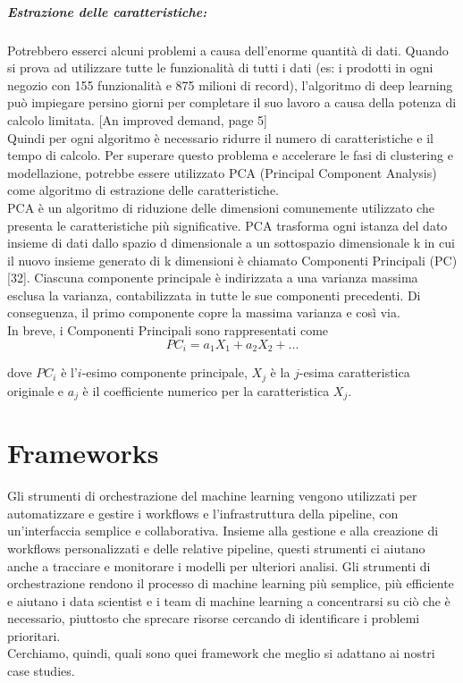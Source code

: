 \documentclass[12pt,a4paper]{report}
\begin{document}
\paragraph*{Estrazione delle caratteristiche:}
Potrebbero esserci alcuni problemi a causa dell'enorme quantità di dati. Quando si prova ad utilizzare tutte le funzionalità di tutti i dati (es: i prodotti in ogni negozio con 155 funzionalità e 875 milioni di record), l'algoritmo di deep learning può impiegare persino giorni per completare il suo lavoro a causa della potenza di calcolo limitata. [An improved demand, page 5]\\
Quindi per ogni algoritmo è necessario ridurre il numero di caratteristiche e il tempo di calcolo. Per superare questo problema e accelerare le fasi di clustering e modellazione, potrebbe essere utilizzato PCA (Principal Component Analysis) come algoritmo di estrazione delle caratteristiche.\\
PCA è un algoritmo di riduzione delle dimensioni comunemente utilizzato che presenta le caratteristiche più significative. PCA trasforma ogni istanza del dato insieme di dati dallo spazio d dimensionale a un sottospazio dimensionale k in cui il nuovo insieme generato di k dimensioni è chiamato Componenti Principali (PC) [32]. Ciascuna componente principale è indirizzata a una varianza massima esclusa la varianza, contabilizzata in tutte le sue componenti precedenti. Di conseguenza, il primo componente copre la massima varianza e così via.\\
In breve, i Componenti Principali sono rappresentati come
\begin{equation}
    {\displaystyle PC_i = a_1X_1 + a_2X_2 + ...}
\end{equation}

dove $PC_i$ è l'$i$-esimo componente principale, $X_j$ è la $j$-esima caratteristica originale e $a_j$ è il coefficiente numerico per la caratteristica $X_j$.

\chapter{Frameworks}
Gli strumenti di orchestrazione del machine learning vengono utilizzati per automatizzare e gestire i workflows e l'infrastruttura della pipeline, con un'interfaccia semplice e collaborativa. Insieme alla gestione e alla creazione di workflows personalizzati e delle relative pipeline, questi strumenti ci aiutano anche a tracciare e monitorare i modelli per ulteriori analisi.
Gli strumenti di orchestrazione rendono il processo di machine learning più semplice, più efficiente e aiutano i data scientist e i team di machine learning a concentrarsi su ciò che è necessario, piuttosto che sprecare risorse cercando di identificare i problemi prioritari.\\
Cerchiamo, quindi, quali sono quei framework che meglio si adattano ai nostri case studies.
\end{document}
